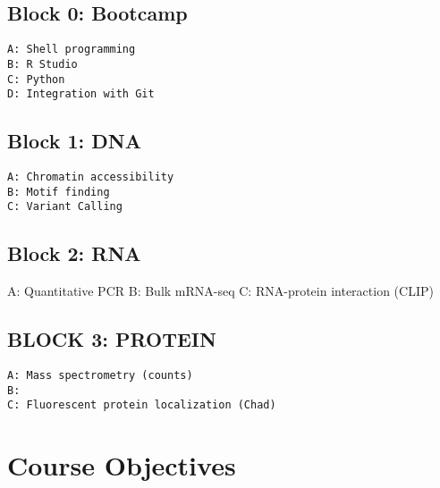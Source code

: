 \documentclass[]{book}
\begin{document}
\hypertarget{block-0-bootcamp}{%
\subsection{Block 0: Bootcamp}\label{block-0-bootcamp}}

\begin{verbatim}
A: Shell programming
B: R Studio
C: Python
D: Integration with Git
\end{verbatim}

\hypertarget{block-1-dna}{%
\subsection{Block 1: DNA}\label{block-1-dna}}

\begin{verbatim}
A: Chromatin accessibility
B: Motif finding
C: Variant Calling
\end{verbatim}

\hypertarget{block-2-rna}{%
\subsection{Block 2: RNA}\label{block-2-rna}}

A: Quantitative PCR
B: Bulk mRNA-seq
C: RNA-protein interaction (CLIP)

\hypertarget{block-3-protein}{%
\subsection{BLOCK 3: PROTEIN}\label{block-3-protein}}

\begin{verbatim}
A: Mass spectrometry (counts)
B:  
C: Fluorescent protein localization (Chad)
\end{verbatim}

\hypertarget{course-objectives}{%
\section{Course Objectives}\label{course-objectives}}
\end{document}
